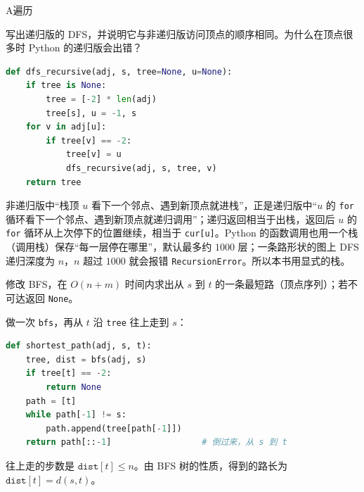 \begin{exercises}{A}{遍历}
\item\label{ex:traversal:A3} 写出递归版的 DFS，并说明它与非递归版访问顶点的顺序相同。为什么在顶点很多时 Python 的递归版会出错？
\begin{solution}
\begin{lstlisting}[language=Python]
def dfs_recursive(adj, s, tree=None, u=None):
    if tree is None:
        tree = [-2] * len(adj)
        tree[s], u = -1, s
    for v in adj[u]:
        if tree[v] == -2:
            tree[v] = u
            dfs_recursive(adj, s, tree, v)
    return tree
\end{lstlisting}
非递归版中“栈顶 $u$ 看下一个邻点、遇到新顶点就进栈”，正是递归版中“$u$ 的 \texttt{for} 循环看下一个邻点、遇到新顶点就递归调用”；递归返回相当于出栈，返回后 $u$ 的 \texttt{for} 循环从上次停下的位置继续，相当于 \texttt{cur[u]}。Python 的函数调用也用一个栈（调用栈）保存“每一层停在哪里”，默认最多约 $1000$ 层；一条路形状的图上 DFS 递归深度为 $n$，$n$ 超过 $1000$ 就会报错 \texttt{RecursionError}。所以本书用显式的栈。
\end{solution}

\item\label{ex:traversal:A4} 修改 BFS，在 $O(n+m)$ 时间内求出从 $s$ 到 $t$ 的一条最短路（顶点序列）；若不可达返回 \texttt{None}。
\begin{solution}
做一次 \texttt{bfs}，再从 $t$ 沿 \texttt{tree} 往上走到 $s$：
\begin{lstlisting}[language=Python]
def shortest_path(adj, s, t):
    tree, dist = bfs(adj, s)
    if tree[t] == -2:
        return None
    path = [t]
    while path[-1] != s:
        path.append(tree[path[-1]])
    return path[::-1]                  # 倒过来，从 s 到 t
\end{lstlisting}
往上走的步数是 $\texttt{dist}[t]\leqslant n$。由 BFS 树的性质，得到的路长为 $\texttt{dist}[t]=d(s,t)$。
\end{solution}
\end{exercises}
